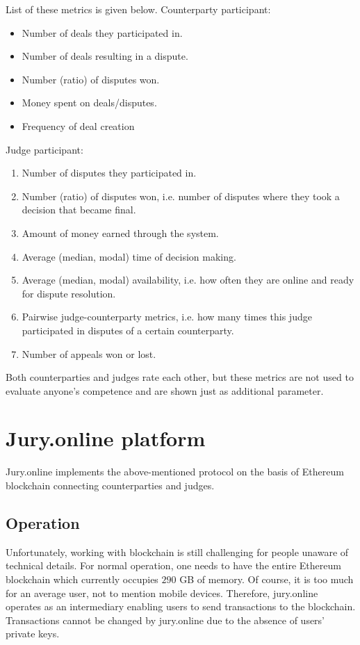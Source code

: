 \documentclass[12pt]{article}
\begin{document}
List of these metrics is given below. 
Counterparty participant:
\begin{itemize}
		\item Number of deals they participated in.
		\item Number of deals resulting in a dispute.
		\item Number (ratio) of disputes won.
		\item Money spent on deals/disputes.
		\item Frequency of deal creation
\end{itemize}
Judge participant:
\begin{enumerate}
		\item Number of disputes they participated in.
		\item Number (ratio) of disputes won, i.e. number of disputes where they took a decision that became final.
		\item Amount of money earned through the system.
		\item Average (median, modal) time of decision making.
		\item Average (median, modal) availability, i.e. how often they are online and ready for dispute resolution.
		\item Pairwise judge-counterparty metrics, i.e. how many times this judge participated in disputes of a certain counterparty.
		\item Number of appeals won or lost.
\end{enumerate}

Both counterparties and judges rate each other, but these metrics are not used to evaluate anyone’s competence and are shown just as additional parameter.

\section{Jury.online platform}
Jury.online implements the above-mentioned protocol on the basis of Ethereum blockchain connecting counterparties and judges. 
\subsection{Operation}
Unfortunately, working with blockchain is still challenging for people unaware of technical details. For normal operation, one needs to have
the entire Ethereum blockchain which currently occupies $290$ GB of memory\cite{etherscan}. Of course, it is too much for an average user, not to mention
mobile devices. Therefore, jury.online operates as an intermediary enabling users to send transactions to the blockchain. Transactions
cannot be changed by jury.online due to the absence of users’ private keys.
\end{document}
